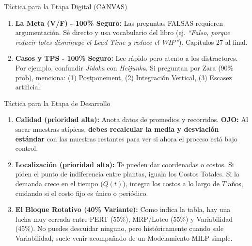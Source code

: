 \begin{tipprueba}{Táctica para la Etapa Digital (CANVAS)}
\begin{enumerate}
    \item \textbf{La Meta (V/F) - 100\% Seguro:} Las preguntas FALSAS requieren argumentación. Sé directo y usa vocabulario del libro (ej. \textit{``Falso, porque reducir lotes disminuye el Lead Time y reduce el WIP''}). Capítulos 27 al final.
    \item \textbf{Casos y TPS - 100\% Seguro:} Lee rápido pero atento a los distractores. Por ejemplo, confundir \textit{Jidoka} con \textit{Heijunka}. Si preguntan por Zara (90\% prob), menciona: (1) Postponement, (2) Integración Vertical, (3) Escasez artificial.
\end{enumerate}
\end{tipprueba}

\begin{tipprueba}{Táctica para la Etapa de Desarrollo}
\begin{enumerate}
    \item \textbf{Calidad (prioridad alta):} Anota datos de promedios y recorridos. \textbf{OJO:} Al sacar muestras atípicas, \textbf{debes recalcular la media y desviación estándar} con las muestras restantes para ver si ahora el proceso está bajo control.
    \item \textbf{Localización (prioridad alta):} Te pueden dar coordenadas o costos. Si piden el punto de indiferencia entre plantas, iguala los Costos Totales. Si la demanda crece en el tiempo ($Q(t)$), integra los costos a lo largo de $T$ años, cuidando si el costo fijo es único o periódico.
    \item \textbf{El Bloque Rotativo (40\% Variante):} Como indica la tabla, hay una lucha muy cerrada entre PERT (55\%), MRP/Loteo (55\%) y Variabilidad (45\%). No puedes descuidar ninguno, pero históricamente cuando sale Variabilidad, suele venir acompañado de un Modelamiento MILP simple.
\end{enumerate}
\end{tipprueba}
